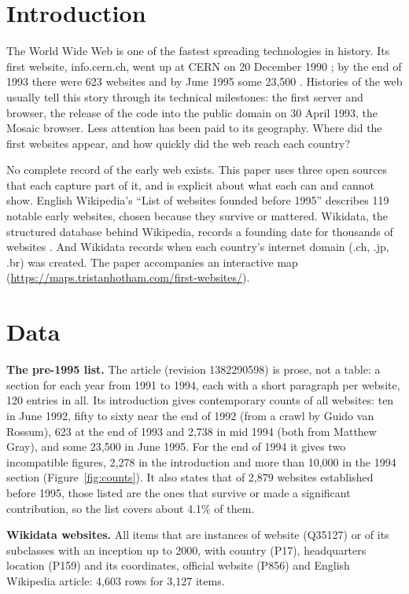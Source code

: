 \documentclass[11pt,a4paper]{article}
\begin{document}
\section{Introduction}
The World Wide Web is one of the fastest spreading technologies in history. Its first website, info.cern.ch, went up at CERN on 20 December 1990 \citep{wikihist}; by the end of 1993 there were 623 websites and by June 1995 some 23,500 \citep{wikilist}. Histories of the web usually tell this story through its technical milestones: the first server and browser, the release of the code into the public domain on 30 April 1993, the Mosaic browser. Less attention has been paid to its geography. Where did the first websites appear, and how quickly did the web reach each country?

No complete record of the early web exists. This paper uses three open sources that each capture part of it, and is explicit about what each can and cannot show. English Wikipedia's ``List of websites founded before 1995'' \citep{wikilist} describes 119 notable early websites, chosen because they survive or mattered. Wikidata, the structured database behind Wikipedia, records a founding date for thousands of websites \citep{wikidata}. And Wikidata records when each country's internet domain (.ch, .jp, .br) was created. The paper accompanies an interactive map (\url{https://maps.tristanhotham.com/first-websites/}).

\section{Data}
\textbf{The pre-1995 list.} The article (revision 1382290598) is prose, not a table: a section for each year from 1991 to 1994, each with a short paragraph per website, 120 entries in all. Its introduction gives contemporary counts of all websites: ten in June 1992, fifty to sixty near the end of 1992 (from a crawl by Guido van Rossum), 623 at the end of 1993 and 2,738 in mid 1994 (both from Matthew Gray), and some 23,500 in June 1995. For the end of 1994 it gives two incompatible figures, 2,278 in the introduction and more than 10,000 in the 1994 section (Figure~\ref{fig:counts}). It also states that of 2,879 websites established before 1995, those listed are the ones that survive or made a significant contribution, so the list covers about 4.1\% of them.

\textbf{Wikidata websites.} All items that are instances of website (Q35127) or of its subclasses with an inception up to 2000, with country (P17), headquarters location (P159) and its coordinates, official website (P856) and English Wikipedia article: 4,603 rows for 3,127 items.
\end{document}
